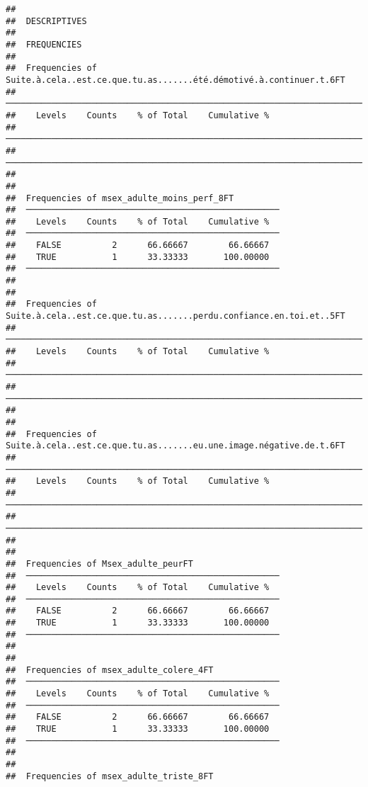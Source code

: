 \documentclass[
]{article}
\begin{document}
\begin{verbatim}
## 
##  DESCRIPTIVES
## 
##  FREQUENCIES
## 
##  Frequencies of Suite.à.cela..est.ce.que.tu.as.......été.démotivé.à.continuer.t.6FT 
##  ────────────────────────────────────────────────────────────────────────────────── 
##    Levels    Counts    % of Total    Cumulative %   
##  ────────────────────────────────────────────────────────────────────────────────── 
##  ────────────────────────────────────────────────────────────────────────────────── 
## 
## 
##  Frequencies of msex_adulte_moins_perf_8FT          
##  ────────────────────────────────────────────────── 
##    Levels    Counts    % of Total    Cumulative %   
##  ────────────────────────────────────────────────── 
##    FALSE          2      66.66667        66.66667   
##    TRUE           1      33.33333       100.00000   
##  ────────────────────────────────────────────────── 
## 
## 
##  Frequencies of Suite.à.cela..est.ce.que.tu.as.......perdu.confiance.en.toi.et..5FT 
##  ────────────────────────────────────────────────────────────────────────────────── 
##    Levels    Counts    % of Total    Cumulative %   
##  ────────────────────────────────────────────────────────────────────────────────── 
##  ────────────────────────────────────────────────────────────────────────────────── 
## 
## 
##  Frequencies of Suite.à.cela..est.ce.que.tu.as.......eu.une.image.négative.de.t.6FT 
##  ────────────────────────────────────────────────────────────────────────────────── 
##    Levels    Counts    % of Total    Cumulative %   
##  ────────────────────────────────────────────────────────────────────────────────── 
##  ────────────────────────────────────────────────────────────────────────────────── 
## 
## 
##  Frequencies of Msex_adulte_peurFT                  
##  ────────────────────────────────────────────────── 
##    Levels    Counts    % of Total    Cumulative %   
##  ────────────────────────────────────────────────── 
##    FALSE          2      66.66667        66.66667   
##    TRUE           1      33.33333       100.00000   
##  ────────────────────────────────────────────────── 
## 
## 
##  Frequencies of msex_adulte_colere_4FT              
##  ────────────────────────────────────────────────── 
##    Levels    Counts    % of Total    Cumulative %   
##  ────────────────────────────────────────────────── 
##    FALSE          2      66.66667        66.66667   
##    TRUE           1      33.33333       100.00000   
##  ────────────────────────────────────────────────── 
## 
## 
##  Frequencies of msex_adulte_triste_8FT              

\end{verbatim}
\end{document}
